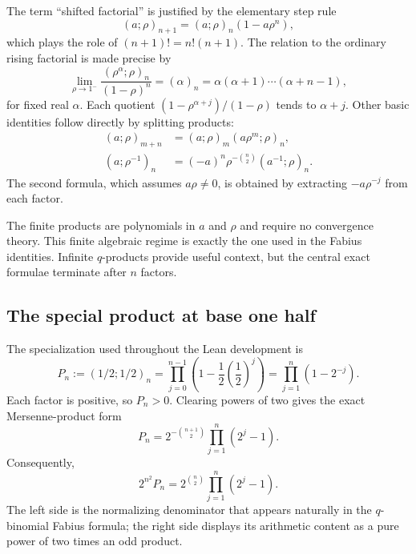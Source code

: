 \documentclass[11pt]{article}
\theoremstyle{definition}
\newcommand{\qpoch}[3]{\left(#1;#2\right)_{#3}}
\begin{document}
The term ``shifted factorial'' is justified by the elementary step rule
\begin{equation}
  \qpoch{a}{\rho}{n+1}
  =\qpoch{a}{\rho}{n}(1-a\rho^n),
  \label{eq:q-pochhammer-step}
\end{equation}
which plays the role of $(n+1)!=n!(n+1)$.  The relation to the ordinary rising factorial is made precise by
\begin{equation}
  \lim_{\rho\to1^-}
  \frac{\qpoch{\rho^\alpha}{\rho}{n}}{(1-\rho)^n}
  =(\alpha)_n
  =\alpha(\alpha+1)\cdots(\alpha+n-1),
  \label{eq:qpoch-classical-limit}
\end{equation}
for fixed real $\alpha$.  Each quotient
$(1-\rho^{\alpha+j})/(1-\rho)$ tends to $\alpha+j$.
Other basic identities follow directly by splitting products:
\begin{align}
  \qpoch{a}{\rho}{m+n}
  &=\qpoch{a}{\rho}{m}\qpoch{a\rho^m}{\rho}{n},
  \label{eq:q-pochhammer-split}\\
  \qpoch{a}{\rho^{-1}}{n}
  &=(-a)^n\rho^{-\binom{n}{2}}
    \qpoch{a^{-1}}{\rho}{n}.
  \label{eq:q-pochhammer-inversion}
\end{align}
The second formula, which assumes $a\rho\ne0$, is obtained by extracting $-a\rho^{-j}$ from each factor.

The finite products are polynomials in $a$ and $\rho$ and require no convergence theory.  This finite algebraic regime is exactly the one used in the Fabius identities.  Infinite $q$-products provide useful context, but the central exact formulae terminate after $n$ factors.

\subsection{The special product at base one half}

The specialization used throughout the Lean development is
\begin{equation}
  P_n:=\qpoch{1/2}{1/2}{n}
  =\prod_{j=0}^{n-1}\left(1-\frac12\left(\frac12\right)^j\right)
  =\prod_{j=1}^{n}(1-2^{-j}).
  \label{eq:Pn-definition}
\end{equation}
Each factor is positive, so $P_n>0$.  Clearing powers of two gives the exact Mersenne-product form
\begin{equation}
  P_n
  =2^{-\binom{n+1}{2}}\prod_{j=1}^{n}(2^j-1).
  \label{eq:Pn-mersenne}
\end{equation}
Consequently,
\begin{equation}
  2^{n^2}P_n
  =2^{\binom{n}{2}}\prod_{j=1}^{n}(2^j-1).
  \label{eq:Pn-normalizer}
\end{equation}
The left side is the normalizing denominator that appears naturally in the $q$-binomial Fabius formula; the right side displays its arithmetic content as a pure power of two times an odd product.
\end{document}
